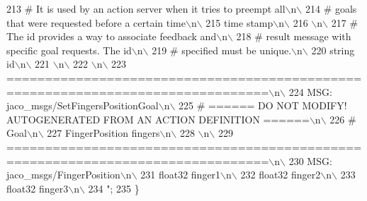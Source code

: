 \begin{DoxyCode}
213 \textcolor{stringliteral}{# It is used by an action server when it tries to preempt all\(\backslash\)n\(\backslash\)}
214 \textcolor{stringliteral}{# goals that were requested before a certain time\(\backslash\)n\(\backslash\)}
215 \textcolor{stringliteral}{time stamp\(\backslash\)n\(\backslash\)}
216 \textcolor{stringliteral}{\(\backslash\)n\(\backslash\)}
217 \textcolor{stringliteral}{# The id provides a way to associate feedback and\(\backslash\)n\(\backslash\)}
218 \textcolor{stringliteral}{# result message with specific goal requests. The id\(\backslash\)n\(\backslash\)}
219 \textcolor{stringliteral}{# specified must be unique.\(\backslash\)n\(\backslash\)}
220 \textcolor{stringliteral}{string id\(\backslash\)n\(\backslash\)}
221 \textcolor{stringliteral}{\(\backslash\)n\(\backslash\)}
222 \textcolor{stringliteral}{\(\backslash\)n\(\backslash\)}
223 \textcolor{stringliteral}{================================================================================\(\backslash\)n\(\backslash\)}
224 \textcolor{stringliteral}{MSG: jaco\_msgs/SetFingersPositionGoal\(\backslash\)n\(\backslash\)}
225 \textcolor{stringliteral}{# ====== DO NOT MODIFY! AUTOGENERATED FROM AN ACTION DEFINITION ======\(\backslash\)n\(\backslash\)}
226 \textcolor{stringliteral}{# Goal\(\backslash\)n\(\backslash\)}
227 \textcolor{stringliteral}{FingerPosition fingers\(\backslash\)n\(\backslash\)}
228 \textcolor{stringliteral}{\(\backslash\)n\(\backslash\)}
229 \textcolor{stringliteral}{================================================================================\(\backslash\)n\(\backslash\)}
230 \textcolor{stringliteral}{MSG: jaco\_msgs/FingerPosition\(\backslash\)n\(\backslash\)}
231 \textcolor{stringliteral}{float32 finger1\(\backslash\)n\(\backslash\)}
232 \textcolor{stringliteral}{float32 finger2\(\backslash\)n\(\backslash\)}
233 \textcolor{stringliteral}{float32 finger3\(\backslash\)n\(\backslash\)}
234 \textcolor{stringliteral}{"};
235   \}
\end{DoxyCode}
